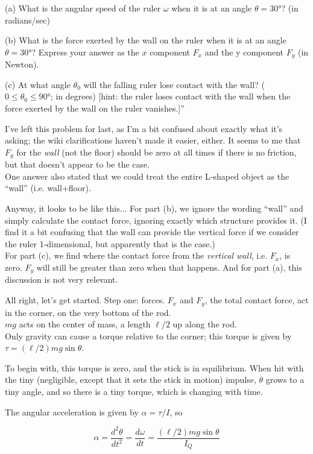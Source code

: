 \documentclass[8.01x]{subfiles}
\begin{document}
(a) What is the angular speed of the ruler $\omega$ when it is at an angle $\theta = \ang{30}$? (in radians/sec)

(b) What is the force exerted by the wall on the ruler when it is at an angle $\theta=\ang{30}$? Express your answer as the $x$ component $F_x$ and the y component $F_y$ (in Newton).

(c) At what angle $\theta_0$ will the falling ruler lose contact with the wall? ($0 \le \theta_0 \le \ang{90}$; in degrees) [hint: the ruler loses contact with the wall when the force exerted by the wall on the ruler vanishes.]''

I've left this problem for last, as I'm a bit confused about exactly what it's asking; the wiki clarifications haven't made it easier, either. It seems to me that $F_y$ for the \emph{wall} (not the floor) should be zero at all times if there is no friction, but that doesn't appear to be the case.\\
One answer also stated that we could treat the entire L-shaped object as the ``wall'' (i.e. wall+floor).

Anyway, it looks to be like this... For part (b), we ignore the wording ``wall'' and simply calculate the contact force, ignoring exactly which structure provides it. (I find it a bit confusing that the wall can provide the vertical force if we consider the ruler 1-dimensional, but apparently that is the case.)\\
For part (c), we find where the contact force from the \emph{vertical wall}, i.e. $F_x$, is zero. $F_y$ will still be greater than zero when that happens. And for part (a), this discussion is not very relevant.

All right, let's get started. Step one: forces. $F_x$ and $F_y$, the total contact force, act in the corner, on the very bottom of the rod.\\
$m g$ acts on the center of mass, a length $\ell/2$ up along the rod.\\
Only gravity can cause a torque relative to the corner; this torque is given by $\tau = (\ell/2) m g \sin \theta$.

To begin with, this torque is zero, and the stick is in equilibrium. When hit with the tiny (negligible, except that it sets the stick in motion) impulse, $\theta$ grows to a tiny angle, and so there is a tiny torque, which is changing with time.

The angular acceleration is given by $\alpha = \tau/I$, so

\begin{equation}
\alpha = \frac{d^2 \theta}{dt^2} = \frac{d \omega}{dt} = \frac{(\ell/2) m g \sin \theta}{I_Q}
\end{equation}
\end{document}
